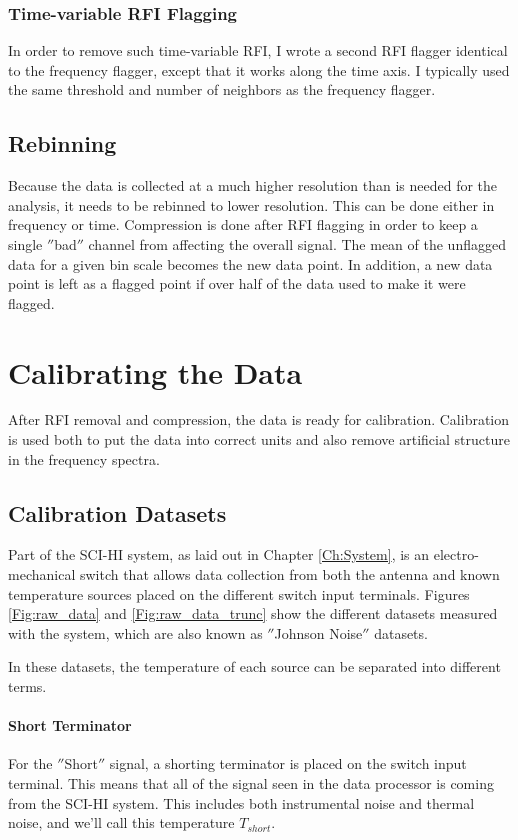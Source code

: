 \subsubsection{Time-variable RFI Flagging}

In order to remove such time-variable RFI, I wrote a second RFI flagger identical to the frequency flagger, except that it works along the time axis. I typically used the same threshold and number of neighbors as the frequency flagger. 

\subsection{Rebinning}

Because the data is collected at a much higher resolution than is needed for the analysis, it needs to be rebinned to lower resolution. This can be done either in frequency or time. Compression is done after RFI flagging in order to keep a single $''$bad$''$ channel from affecting the overall signal. The mean of the unflagged data for a given bin scale becomes the new data point. In addition, a new data point is left as a flagged point if over half of the data used to make it were flagged. 

\section{Calibrating the Data}

After RFI removal and compression, the data is ready for calibration. Calibration is used both to put the data into correct units and also remove artificial structure in the frequency spectra. 

\subsection{Calibration Datasets}

Part of the SCI-HI system, as laid out in Chapter \ref{Ch:System}, is an electro-mechanical switch that allows data collection from both the antenna and known temperature sources placed on the different switch input terminals. Figures \ref{Fig:raw_data} and \ref{Fig:raw_data_trunc} show the different datasets measured with the system, which are also known as $''$Johnson Noise$''$ datasets. 

In these datasets, the temperature of each source can be separated into different terms. 

\paragraph{Short Terminator}
For the $''$Short$''$ signal, a shorting terminator is placed on the switch input terminal. This means that all of the signal seen in the data processor is coming from the SCI-HI system. This includes both instrumental noise and thermal noise, and we'll call this temperature $T_{short}$.

